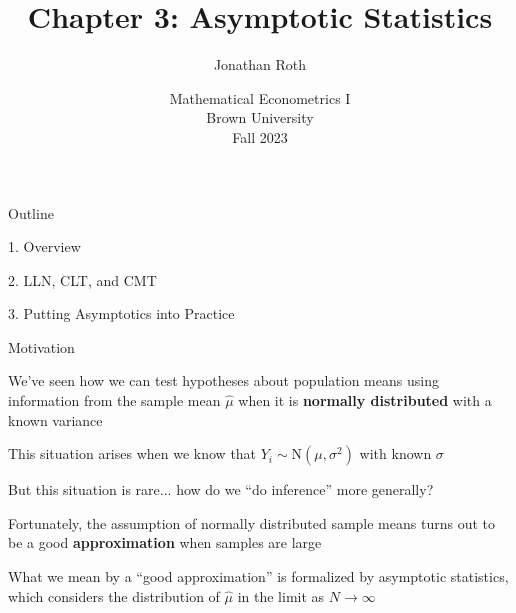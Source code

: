 \documentclass[11pt,english,handout]{beamer}
\newenvironment{wideitemize}{\itemize\addtolength{\itemsep}{10pt}}{\enditemize}
\begin{document}
\begin{frame}[noframenumbering]{}
\vspace{0.5cm}
\title[]{Chapter 3: Asymptotic Statistics}
\author{Jonathan Roth}
\date{Mathematical Econometrics I \\ Brown University\\Fall 2023} 
\titlepage {\small{}\ }\thispagestyle{empty} \vspace{-30pt}

\end{frame}

 
\begin{frame}{Outline}

1. Overview
\vspace{0.8cm}

2. LLN, CLT, and CMT
\vspace{0.8cm}

3. Putting Asymptotics into Practice

\end{frame}


\begin{frame}{Motivation}

\begin{wideitemize}
	
\item 
We've seen how we can test hypotheses about population means using information from the sample mean $\hat\mu$ when it is \textbf{normally distributed} with a known variance

\item
This situation arises when we know that $Y_i\sim \mathrm{N}(\mu,\sigma^2)$ with known $\sigma$	

\item
But this situation is rare... how do we ``do inference'' more generally? 

\pause

\item
Fortunately, the assumption of normally distributed sample means turns out to be a good \textbf{approximation} when samples are large

\pause
\item
What we mean by a ``good approximation'' is formalized by asymptotic statistics,  which considers the distribution of $\hat\mu$ in the limit as $N \rightarrow \infty$
	
\end{wideitemize}		

\end{frame}
\end{document}

